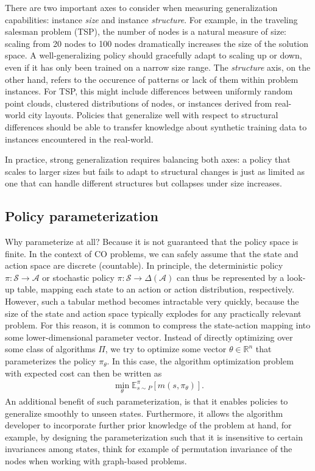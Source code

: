 \documentclass[a4paper]{report}
\theoremstyle{definition}
\theoremstyle{plain}
\newcommand\note[1]{{\color{Navy}\noindent#1}}
\begin{document}
There are two important axes to consider when measuring generalization
capabilities: instance \emph{size} and instance \emph{structure}.
%
For example, in the traveling salesman problem (TSP), the number of nodes is a
natural measure of size: scaling from 20 nodes to 100 nodes dramatically
increases the size of the solution space. A well-generalizing policy should
gracefully adapt to scaling up or down, even if it has only been trained on a
narrow size range.
%
The \emph{structure} axis, on the other hand, refers to the occurence of patterns or
lack of them within problem instances. For TSP, this might include differences
between uniformly random point clouds, clustered distributions of nodes, or
instances derived from real-world city layouts. Policies that generalize well
with respect to structural differences should be able to transfer knowledge
about synthetic training data to instances encountered in the real-world.

In practice, strong generalization requires balancing both axes: a policy that
scales to larger sizes but fails to adapt to structural changes is just as
limited as one that can handle different structures but collapses under size
increases.


\subsection{Policy parameterization}

\note{Why parameterize at all? Because it is not guaranteed that the policy space is finite.}
In the context of CO problems, we can safely assume that the state and action
space are discrete (countable).
%
In principle, the deterministic policy $\pi : \mathcal{S} \rightarrow \mathcal{A}$ or
stochastic policy $\pi : \mathcal{S} \rightarrow \Delta(\mathcal{A})$ can thus be represented by
a look-up table, mapping each state to an action or action distribution,
respectively.
%
However, such a tabular method becomes intractable very quickly, because the
size of the state and action space typically explodes for any practically
relevant problem.
For this reason, it is common to compress the state-action mapping into some
lower-dimensional parameter vector.
%
Instead of directly optimizing over some class of algorithms $\Pi$, we try to
optimize some vector $\theta \in \mathbb{R}^n$ that parameterizes the policy $\pi_\theta$. In
this case, the algorithm optimization problem with expected cost can then be
written as
\begin{align}
  \label{eq:4}
  \min_\theta \mathbb{E}_{s \sim P}^\pi \left[ m(s, \pi_\theta) \right] .
\end{align}
%
An additional benefit of such parameterization, is that it enables policies to
generalize smoothly to unseen states.
Furthermore, it allows the algorithm developer to incorporate further prior
knowledge of the problem at hand, for example, by designing the parameterization
such that it is insensitive to certain invariances among states, think for
example of permutation invariance of the nodes when working with graph-based
problems.
\end{document}
